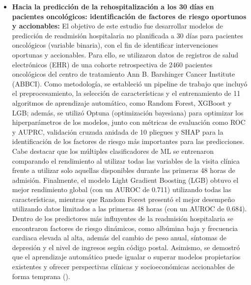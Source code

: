 \begin{itemize}
\item \textbf{Hacia la predicción de la rehospitalización a los 30 días en pacientes oncológicos: identificación de factores de riesgo oportunos y accionables:} El objetivo de este estudio fue desarrollar modelos de predicción de readmisión hospitalaria no planificada a 30 días para pacientes oncológicos (variable binaria), con el fin de identificar intervenciones oportunas y accionables. Para ello, se utilizaron datos de registros de salud electrónicos (EHR) de una cohorte retrospectiva de 2460 pacientes oncológicos del centro de tratamiento Ann B. Barshinger Cancer Institute (ABBCI). Como metodología, se estableció un pipeline de trabajo que incluyó el preprocesamiento, la selección de características y el entrenamiento de 11 algoritmos de aprendizaje automático, como Random Forest, XGBoost y LGB; además, se utilizó Optuna (optimización bayesiana) para optimizar los hiperparámetros de los modelos, junto con métricas de evaluación como ROC y AUPRC, validación cruzada anidada de 10 pliegues y SHAP para la identificación de los factores de riesgo más importantes para las predicciones. Cabe destacar que los múltiples clasificadores de ML se entrenaron comparando el rendimiento al utilizar todas las variables de la visita clínica frente a utilizar solo aquellas disponibles durante las primeras 48 horas de admisión. Finalmente, el modelo Light Gradient Boosting (LGB) obtuvo el mejor rendimiento global (con un AUROC de 0.711) utilizando todas las características, mientras que Random Forest presentó el mejor desempeño utilizando datos limitados a las primeras 48 horas (con un AUROC de 0.684). Dentro de los predictores más influyentes de la readmisión hospitalaria se encontraron factores de riesgo dinámicos, como albúmina baja y frecuencia cardiaca elevada al alta, además del cambio de peso anual, síntomas de depresión y el nivel de ingresos según código postal. Asimismo, se demostró que el aprendizaje automático puede igualar o superar modelos propietarios existentes y ofrecer perspectivas clínicas y socioeconómicas accionables de forma temprana (\cite{article3}).

\end{itemize}
